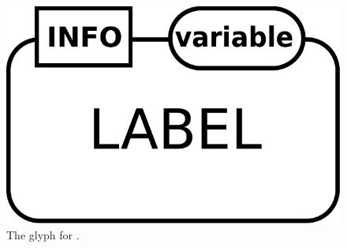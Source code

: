 \begin{figure}[H]
  \centering
  \includegraphics[scale = 0.3]{images/entity}
  \caption{The \ER glyph for .}
  \label{fig:macromolecule}
\end{figure}

\normalcolor

